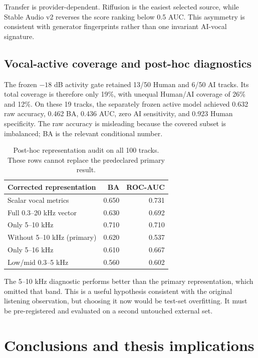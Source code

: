 \documentclass[11pt,a4paper]{article}
\begin{document}
Transfer is provider-dependent. Riffusion is the easiest selected source, while Stable Audio v2 reverses the score ranking below 0.5 AUC. This asymmetry is consistent with generator fingerprints rather than one invariant AI-vocal signature.

\subsection{Vocal-active coverage and post-hoc diagnostics}

The frozen $-18$ dB activity gate retained 13/50 Human and 6/50 AI tracks. Its total coverage is therefore only 19\%, with unequal Human/AI coverage of 26\% and 12\%. On these 19 tracks, the separately frozen active model achieved 0.632 raw accuracy, 0.462 BA, 0.436 AUC, zero AI sensitivity, and 0.923 Human specificity. The raw accuracy is misleading because the covered subset is imbalanced; BA is the relevant conditional number.

\begin{table}[H]
\centering
\caption{Post-hoc representation audit on all 100 tracks. These rows cannot replace the predeclared primary result.}
\begin{tabular}{lrr}
\toprule
Corrected representation & BA & ROC-AUC \\
\midrule
Scalar vocal metrics & 0.650 & 0.731 \\
Full 0.3--20 kHz vector & 0.630 & 0.692 \\
Only 5--10 kHz & 0.710 & 0.710 \\
Without 5--10 kHz (primary) & 0.620 & 0.537 \\
Only 5--16 kHz & 0.610 & 0.667 \\
Low/mid 0.3--5 kHz & 0.560 & 0.602 \\
\bottomrule
\end{tabular}
\end{table}

The 5--10 kHz diagnostic performs better than the primary representation, which omitted that band. This is a useful hypothesis consistent with the original listening observation, but choosing it now would be test-set overfitting. It must be pre-registered and evaluated on a second untouched external set.

\section{Conclusions and thesis implications}
\end{document}
